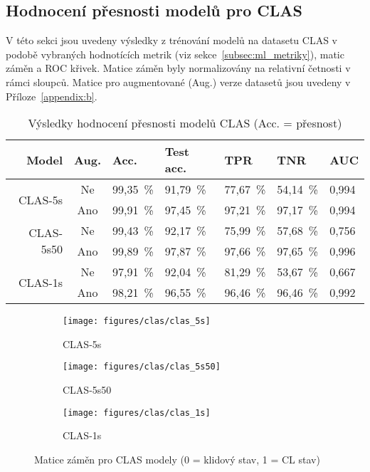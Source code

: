 \subsection{Hodnocení přesnosti modelů pro CLAS}
\label{subsec:clas_models}
V této sekci jsou uvedeny výsledky z trénování modelů na datasetu CLAS v podobě
vybraných hodnotících metrik (viz sekce~\ref{subsec:ml_metriky}), matic záměn a
ROC křivek. Matice záměn byly normalizovány na relativní četnosti v rámci
sloupců. Matice pro augmentované (Aug.) verze datasetů jsou uvedeny v
Příloze~\ref{appendix:b}.

\begin{table}[h]
    \small
    \centering
    \caption{Výsledky hodnocení přesnosti modelů CLAS (Acc. = přesnost)}
    \begin{tabular*}{\linewidth}{@{\extracolsep{\fill}} r|c|lllll @{}}
        \toprule
        Model                      & Aug. & Acc.     & Test acc. & TPR      & TNR      & AUC   \\ \midrule
        \multirow{2}{*}{CLAS-5s}   & Ne   & 99,35~\% & 91,79~\%  & 77,67~\% & 54,14~\% & 0,994 \\
        & Ano  & 99,91~\% & 97,45~\%  & 97,21~\% & 97,17~\% & 0,994 \\ \midrule
        \multirow{2}{*}{CLAS-5s50} & Ne   & 99,43~\% & 92,17~\%  & 75,99~\% & 57,68~\% & 0,756 \\
        & Ano  & 99,89~\% & 97,87~\%  & 97,66~\% & 97,65~\% & 0,996 \\ \midrule
        \multirow{2}{*}{CLAS-1s}   & Ne   & 97,91~\% & 92,04~\%  & 81,29~\% & 53,67~\% & 0,667 \\
        & Ano  & 98,21~\% & 96,55~\%  & 96,46~\% & 96,46~\% & 0,992 \\
        \bottomrule
    \end{tabular*}
    \label{tab:clas_eval}
\end{table}

\begin{figure}[!htb]
    \centering
    \begin{subfigure}[h]{0.32\linewidth}
        \texttt{[image: figures/clas/clas\_5s]}
        \caption{CLAS-5s}
    \end{subfigure}
    \hspace{0.05cm}
    \begin{subfigure}[h]{0.32\linewidth}
        \texttt{[image: figures/clas/clas\_5s50]}
        \caption{CLAS-5s50}
    \end{subfigure}
    \hspace{0.05cm}
    \begin{subfigure}[h]{0.32\linewidth}
        \texttt{[image: figures/clas/clas\_1s]}
        \caption{CLAS-1s}
    \end{subfigure}
    \caption{Matice záměn pro CLAS modely (0 = klidový stav, 1 = CL stav)}
    \label{fig:results_cm_clas}
\end{figure}

